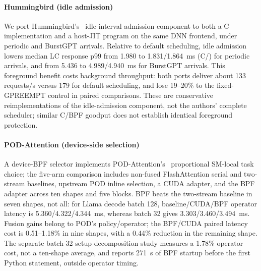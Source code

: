 \paragraph{Hummingbird (idle admission)}
We port Hummingbird's~\cite{hu2026hummingbird} idle-interval admission component to both a C implementation and a host-JIT \sys{} program on the same DNN frontend, under periodic and BurstGPT arrivals.
Relative to default scheduling, idle admission lowers median LC response p99 from 1.980 to 1.831/1.864~ms (C/\sys{}) for periodic arrivals, and from 5.436 to 4.989/4.940~ms for BurstGPT arrivals.
This foreground benefit costs background throughput: both ports deliver about 133 requests/s versus 179 for default scheduling, and lose 19--20\% to the fixed-GPREEMPT control in paired comparisons.
These are conservative reimplementations of the idle-admission component, not the authors' complete scheduler; similar C/BPF goodput does not establish identical foreground protection.

\paragraph{POD-Attention (device-side selection)}
A device-BPF selector implements POD-Attention's~\cite{kamath2025pod} proportional SM-local task choice; the five-arm comparison includes non-fused FlashAttention serial and two-stream baselines, upstream POD inline selection, a CUDA adapter, and the BPF adapter across ten shapes and five blocks.
BPF beats the two-stream baseline in seven shapes, not all: for Llama decode batch 128, baseline/CUDA/BPF operator latency is 5.360/4.322/4.344~ms, whereas batch 32 gives 3.303/3.460/3.494~ms.
Fusion gains belong to POD's policy/operator; the BPF/CUDA paired latency cost is 0.51--1.18\% in nine shapes, with a 0.44\% reduction in the remaining shape.
The separate batch-32 setup-decomposition study measures a 1.78\% operator cost, not a ten-shape average, and reports 271~s of BPF startup before the first Python statement, outside operator timing.

